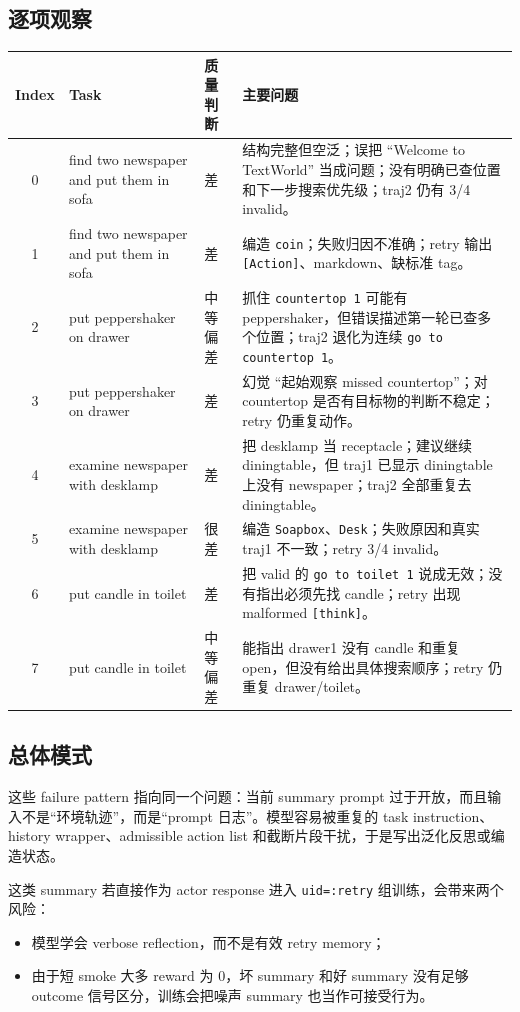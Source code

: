 \documentclass[10pt]{ctexart}
\begin{document}
\subsection{逐项观察}
\begin{center}
\small
\begin{tabularx}{\linewidth}{c l l X}
\toprule
Index & Task & 质量判断 & 主要问题 \\
\midrule
0 & find two newspaper and put them in sofa & 差 &
结构完整但空泛；误把 ``Welcome to TextWorld'' 当成问题；没有明确已查位置和下一步搜索优先级；traj2 仍有 3/4 invalid。 \\
1 & find two newspaper and put them in sofa & 差 &
编造 \texttt{coin}；失败归因不准确；retry 输出 \texttt{[Action]}、markdown、缺标准 tag。 \\
2 & put peppershaker on drawer & 中等偏差 &
抓住 \texttt{countertop 1} 可能有 peppershaker，但错误描述第一轮已查多个位置；traj2 退化为连续 \texttt{go to countertop 1}。 \\
3 & put peppershaker on drawer & 差 &
幻觉 ``起始观察 missed countertop''；对 countertop 是否有目标物的判断不稳定；retry 仍重复动作。 \\
4 & examine newspaper with desklamp & 差 &
把 desklamp 当 receptacle；建议继续 diningtable，但 traj1 已显示 diningtable 上没有 newspaper；traj2 全部重复去 diningtable。 \\
5 & examine newspaper with desklamp & 很差 &
编造 \texttt{Soapbox}、\texttt{Desk}；失败原因和真实 traj1 不一致；retry 3/4 invalid。 \\
6 & put candle in toilet & 差 &
把 valid 的 \texttt{go to toilet 1} 说成无效；没有指出必须先找 candle；retry 出现 malformed \texttt{[think]}。 \\
7 & put candle in toilet & 中等偏差 &
能指出 drawer1 没有 candle 和重复 open，但没有给出具体搜索顺序；retry 仍重复 drawer/toilet。 \\
\bottomrule
\end{tabularx}
\end{center}

\subsection{总体模式}
这些 failure pattern 指向同一个问题：当前 summary prompt 过于开放，而且输入不是“环境轨迹”，而是“prompt 日志”。模型容易被重复的 task instruction、history wrapper、admissible action list 和截断片段干扰，于是写出泛化反思或编造状态。

这类 summary 若直接作为 actor response 进入 \texttt{uid=:retry} 组训练，会带来两个风险：
\begin{itemize}
  \item 模型学会 verbose reflection，而不是有效 retry memory；
  \item 由于短 smoke 大多 reward 为 0，坏 summary 和好 summary 没有足够 outcome 信号区分，训练会把噪声 summary 也当作可接受行为。
\end{itemize}
\end{document}
